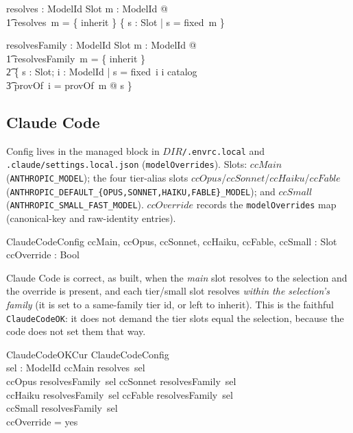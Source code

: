 \documentclass{article}
\begin{document}
\begin{axdef}
  resolves : ModelId \fun \power Slot
\where
  \forall m : ModelId @ \\
  \t1 resolves~m = \{ inherit \} \cup \{ s : Slot | s = fixed~m \}
\end{axdef}

\begin{axdef}
  resolvesFamily : ModelId \fun \power Slot
\where
  \forall m : ModelId @ \\
  \t1 resolvesFamily~m = \{ inherit \} \cup \\
  \t2 \{ s : Slot; i : ModelId | s = fixed~i \land i \in catalog \land \\
  \t3   provOf~i = provOf~m @ s \}
\end{axdef}

\subsection{Claude Code}

Config lives in the managed block in $DIR$\texttt{/.envrc.local} and
\texttt{.claude/settings.local.json} (\texttt{modelOverrides}). Slots: $ccMain$
(\texttt{ANTHROPIC\_MODEL}); the four tier-alias slots
$ccOpus$/$ccSonnet$/$ccHaiku$/$ccFable$
(\texttt{ANTHROPIC\_DEFAULT\_\{OPUS,SONNET,HAIKU,FABLE\}\_MODEL}); and $ccSmall$
(\texttt{ANTHROPIC\_SMALL\_FAST\_MODEL}). $ccOverride$ records the
\texttt{modelOverrides} map (canonical-key and raw-identity entries).

\begin{schema}{ClaudeCodeConfig}
  ccMain, ccOpus, ccSonnet, ccHaiku, ccFable, ccSmall : Slot \\
  ccOverride : Bool
\end{schema}

Claude Code is correct, as built, when the \emph{main} slot resolves to the
selection and the override is present, and each tier/small slot resolves
\emph{within the selection's family} (it is set to a same-family tier id, or
left to inherit). This is the faithful \texttt{ClaudeCodeOK}: it does not demand
the tier slots equal the selection, because the code does not set them that way.

\begin{schema}{ClaudeCodeOKCur}
  ClaudeCodeConfig \\
  sel : ModelId
\where
  ccMain \in resolves~sel \\
  ccOpus \in resolvesFamily~sel \land ccSonnet \in resolvesFamily~sel \\
  ccHaiku \in resolvesFamily~sel \land ccFable \in resolvesFamily~sel \\
  ccSmall \in resolvesFamily~sel \\
  ccOverride = yes
\end{schema}
\end{document}
